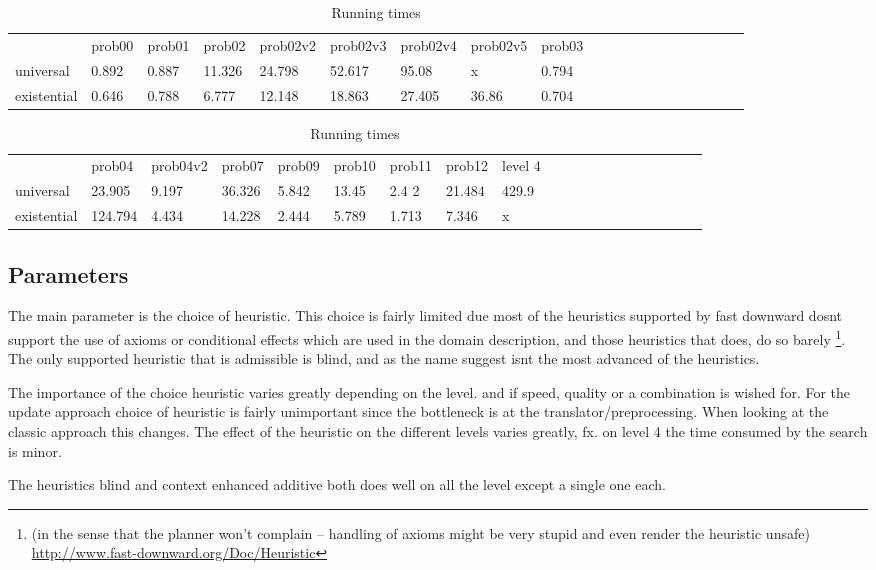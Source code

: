 			\begin{table}[h]
				\centering
				\caption{Running times}
				\label{times}
				\begin{tabular}{llllllllllllllllllll}
					& prob00 & prob01& prob02& prob02v2& prob02v3& prob02v4& prob02v5& prob03\\
					universal 	& 0.892  &0.887  &11.326 &24.798   &52.617   &95.08    & x       &0.794    \\
					existential &0.646   &0.788  &6.777  &12.148   &18.863   &27.405   &36.86    &0.704  \\
				\end{tabular}
				\begin{tabular}{llllllllllllllllllll}
					&  prob04& prob04v2& prob07&  prob09& prob10& prob11& prob12 & level 4\\
					universal    &23.905  &9.197      &36.326   &5.842  &13.45  &2.4 2           &21.484 &429.9\\
					existential      &124.794 &4.434   &14.228 &2.444  &5.789  &1.713        &7.346 & x\\
				\end{tabular}
			\end{table}


\subsection{Parameters}
The main parameter is the choice of heuristic. This choice is fairly limited due most of the heuristics supported by fast downward dosnt support the use of axioms or conditional effects which are used in the domain description, and those heuristics that does, do so barely \footnote{(in the sense that the planner won't complain -- handling of axioms might be very stupid and even render the heuristic unsafe) \url{http://www.fast-downward.org/Doc/Heuristic}}. The only supported heuristic that is admissible is blind, and as the name suggest isnt the most advanced of the heuristics.


The importance of the choice heuristic varies greatly depending on the level. and if speed, quality or a combination is wished for. For the update approach choice of heuristic is fairly unimportant since the bottleneck is at the translator/preprocessing. When looking at the classic approach this changes. The effect of the heuristic on the different levels varies greatly, fx. on level 4 the time consumed by the search is minor.

The heuristics blind and context enhanced additive both does well on all the level except a single one each. 

